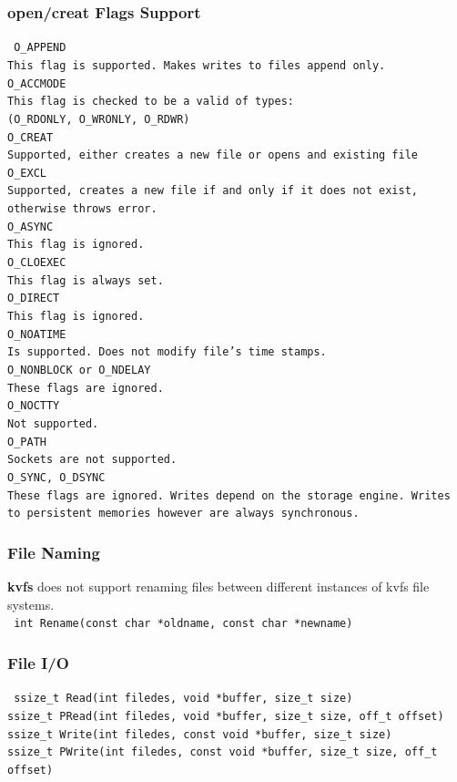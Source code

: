 \documentclass[bsc,frontabs,twoside,singlespacing,parskip,deptreport]{infthesis}     %
\begin{document}
{\subsubsection{open/creat Flags Support}
{\tt
	O\_APPEND \\ \tab This flag is supported. Makes writes to files append only.
	\\
	O\_ACCMODE \\ \tab This flag is checked to be a valid of types: \\ \tab \tab (O\_RDONLY, O\_WRONLY, O\_RDWR)
	\\
	O\_CREAT \\ \tab Supported, either creates a new file or opens and existing file
	\\
	O\_EXCL \\ \tab Supported, creates a new file if and only if it does not exist, otherwise throws error.
\\
	O\_ASYNC
	\\ \tab This flag is ignored.
\\
O\_CLOEXEC
	\\ \tab This flag is always set.
\\
O\_DIRECT
	\\ \tab	This flag is ignored.
\\
O\_NOATIME
	\\ \tab Is supported. Does not modify file's time stamps.
\\
O\_NONBLOCK or O\_NDELAY
	\\ \tab These flags are ignored.
\\
O\_NOCTTY
	\\ \tab Not supported.
\\
O\_PATH
	\\ \tab Sockets are not supported.
\\
O\_SYNC, O\_DSYNC
	\\ \tab These flags are ignored. Writes depend on the storage engine. Writes to persistent memories however are always synchronous.
}
\subsubsection{File Naming}
{\bf kvfs} does not support renaming files between different instances of kvfs file systems.\\
{\tt
	int Rename(const char *oldname, const char *newname)
}
\subsubsection{File I/O}
{\tt
	ssize\_t Read(int filedes, void *buffer, size\_t size)
	\\
	ssize\_t PRead(int filedes, void *buffer, size\_t size, off\_t offset)
	\\
	ssize\_t Write(int filedes, const void *buffer, size\_t size)
	\\
	ssize\_t PWrite(int filedes, const void *buffer, size\_t size, off\_t offset)
}
}
\end{document}
